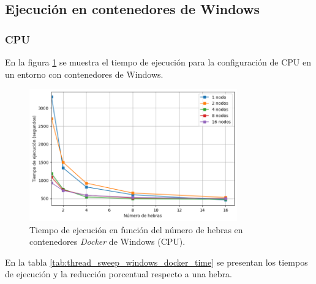\subsection{Ejecución en contenedores de Windows}
\subsubsection{CPU}

En la figura \ref{fig:thread_sweep_windows_docker_time} se muestra el tiempo de ejecución para la configuración de CPU en un entorno con contenedores de Windows.

\begin{figure}[ht]
    \centering
    \includegraphics[width=0.8\textwidth]{imagenes/cap5/thread_sweep_windows_docker_time.png}
    \caption{Tiempo de ejecución en función del número de hebras en contenedores \textit{Docker} de Windows (CPU).}
    \label{fig:thread_sweep_windows_docker_time}
\end{figure}

En la tabla \ref{tab:thread_sweep_windows_docker_time} se presentan los tiempos de ejecución y la reducción porcentual respecto a una hebra.

